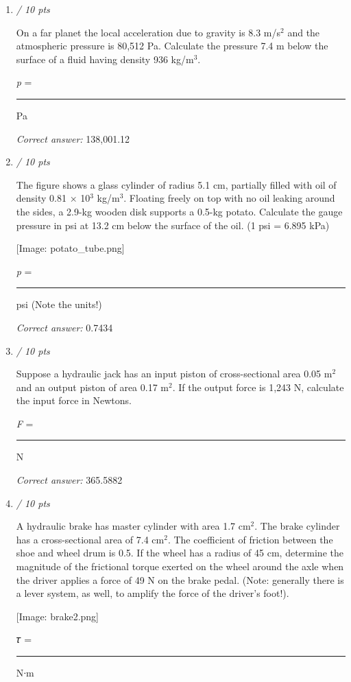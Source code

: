 \documentclass[11pt]{article}
\begin{document}
\begin{enumerate}[leftmargin=*,label=\textbf{Question \arabic*.}]
\item \hfill \textit{/ 10 pts}

On a far planet the local acceleration due to gravity is 8.3 m/s$^{2}$ and the atmospheric pressure is 80,512 Pa. Calculate the pressure 7.4 m below the surface of a fluid having density 936 kg/m$^{3}$.



\emph{p} = \rule{2cm}{0.4pt} Pa

\textit{Correct answer: } 138,001.12

\item \hfill \textit{/ 10 pts}

The figure shows a glass cylinder of radius 5.1 cm, partially filled with oil of density 0.81 × 10$^{3}$ kg/m$^{3}$. Floating freely on top with no oil leaking around the sides, a 2.9-kg wooden disk supports a 0.5-kg potato. Calculate the gauge pressure in psi at 13.2 cm below the surface of the oil. (1 psi = 6.895 kPa)

[Image: potato\_tube.png]



\emph{p} = \rule{2cm}{0.4pt} psi (Note the units!)

\textit{Correct answer: } 0.7434

\item \hfill \textit{/ 10 pts}

Suppose a hydraulic jack has an input piston of cross-sectional area 0.05 m$^{2}$ and an output piston of area 0.17 m$^{2}$. If the output force is 1,243 N, calculate the input force in Newtons.



\emph{F} = \rule{2cm}{0.4pt} N

\textit{Correct answer: } 365.5882

\item \hfill \textit{/ 10 pts}

A hydraulic brake has master cylinder with area 1.7 cm$^{2}$. The brake cylinder has a cross-sectional area of 7.4 cm$^{2}$. The coefficient of friction between the shoe and wheel drum is 0.5. If the wheel has a radius of 45 cm, determine the magnitude of the frictional torque exerted on the wheel around the axle when the driver applies a force of 49 N on the brake pedal. (Note: generally there is a lever system, as well, to amplify the force of the driver's foot!).

[Image: brake2.png]



𝜏 = \rule{2cm}{0.4pt} Nᐧm


\end{enumerate}
\end{document}
